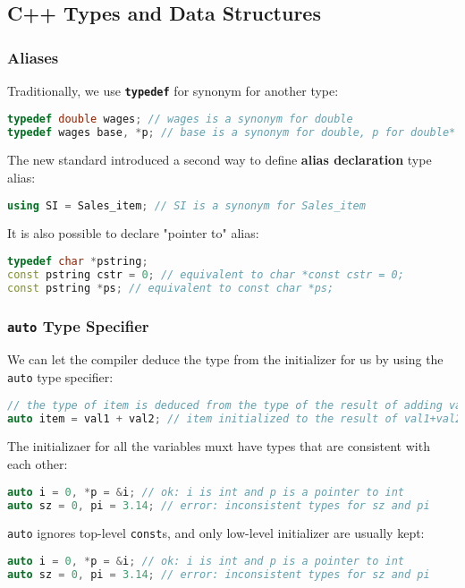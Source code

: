 \subsection{C++ Types and Data Structures}
\label{task:20231122_cpp}

\subsubsection{Aliases}

Traditionally, we use \textbf{\texttt{typedef}} for synonym for another type:
\begin{lstlisting}[language=C++]
typedef double wages; // wages is a synonym for double 
typedef wages base, *p; // base is a synonym for double, p for double*
\end{lstlisting}


The new standard introduced a second way to define \textbf{alias declaration} type alias:
\begin{lstlisting}[language=C++]
using SI = Sales_item; // SI is a synonym for Sales_item
\end{lstlisting}

It is also possible to declare "pointer to" alias:
\begin{lstlisting}[language=C++]
typedef char *pstring; 
const pstring cstr = 0; // equivalent to char *const cstr = 0; 
const pstring *ps; // equivalent to const char *ps;
\end{lstlisting}

\subsubsection{\texttt{auto} Type Specifier}

We can let the compiler deduce the type from the initializer for us by using the \texttt{auto} type specifier:
\begin{lstlisting}[language=C++]
// the type of item is deduced from the type of the result of adding val1 and val2 
auto item = val1 + val2; // item initialized to the result of val1+val2
\end{lstlisting}

The initializaer for all the variables muxt have types that are consistent with each other:
\begin{lstlisting}[language=C++]
auto i = 0, *p = &i; // ok: i is int and p is a pointer to int 
auto sz = 0, pi = 3.14; // error: inconsistent types for sz and pi
\end{lstlisting}

\texttt{auto} ignores top-level \texttt{const}s, and only low-level initializer are usually kept:
\begin{lstlisting}[language=C++]
auto i = 0, *p = &i; // ok: i is int and p is a pointer to int 
auto sz = 0, pi = 3.14; // error: inconsistent types for sz and pi
\end{lstlisting}